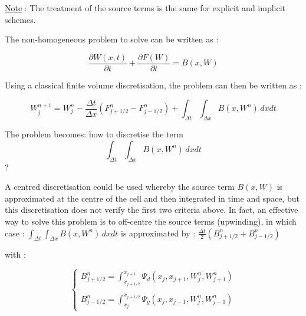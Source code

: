\vspace{0.5cm}

\underline{Note} : The treatment of the source terms is the same for explicit and implicit schemes.

\vspace{0.5cm}

The non-homogeneous problem to solve can be written as :

\begin{equation}
 \frac{\partial W(x,t)}{\partial t} + \frac{\partial F(W)}{\partial t} = B(x,W)
\end{equation}

\vspace{0.5cm}

Using a classical finite volume discretisation, the problem can then be written as :

\begin{equation}
 W_{j}^{n+1} = W_{j}^n - \frac{\Delta t}{\Delta x}(F_{j+1/2}^n - F_{j-1/2}^n) + \int_{\Delta t} \int_{\Delta x} B(x,W^n) \,dxdt
\end{equation}

\vspace{0.5cm}

The problem becomes: how to discretise the term 
\begin{equation}
 \int_{\Delta t} \int_{\Delta x} B(x,W^n) \,dxdt \nonumber
\end{equation}
?
\vspace{0.5cm}

A centred discretisation could be used whereby the source term $B(x,W)$ is approximated at the centre of the cell and then integrated in time and space, but this discretisation does not verify the first two criteria above. In fact, an effective way to solve this problem is to off-centre the source terms (upwinding), in which case :
$\int_{\Delta t} \int_{\Delta x} B(x,W^n) \,dxdt$ is approximated by : $\frac{\Delta t}{2}(B_{j+1/2}^n + B_{j-1/2}^n)$
\vspace{0.5cm}

with :

\begin{equation}
 \left \lbrace
  \begin{array}{l}
    B_{j+1/2}^n = \int_{x_{j+1/2}}^{x_{j+1}} \Psi_d (x_j , x_{j+1} , W_{j}^n , W_{j+1}^n ) \\
    \\
    B_{j-1/2}^n = \int_{x_{j}}^{x_{j+1/2}} \Psi_g (x_j , x_{j-1} , W_{j}^n , W_{j-1}^n )
  \end{array}
 \right.
\end{equation}

